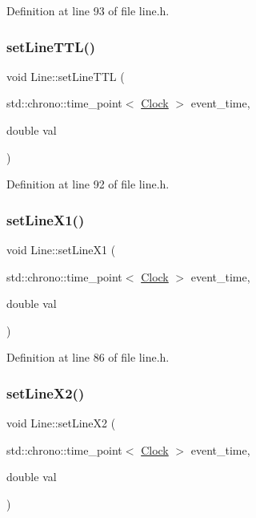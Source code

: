 Definition at line 93 of file line.\+h.

\mbox{\label{class_line_a602398c8c3131ec7236ccadbab8281d5}} 
\subsubsection{\texorpdfstring{set\+Line\+T\+T\+L()}{setLineTTL()}}
{\footnotesize\ttfamily void Line\+::set\+Line\+T\+TL (\begin{DoxyParamCaption}\item[{std\+::chrono\+::time\+\_\+point$<$ \hyperlink{universe_8h_a0ef8d951d1ca5ab3cfaf7ab4c7a6fd80}{Clock} $>$}]{event\+\_\+time,  }\item[{double}]{val }\end{DoxyParamCaption})\hspace{0.3cm}{\ttfamily [inline]}}



Definition at line 92 of file line.\+h.

\mbox{\label{class_line_ab8df9f66bffc86994db3150a4eb8ed29}} 
\subsubsection{\texorpdfstring{set\+Line\+X1()}{setLineX1()}}
{\footnotesize\ttfamily void Line\+::set\+Line\+X1 (\begin{DoxyParamCaption}\item[{std\+::chrono\+::time\+\_\+point$<$ \hyperlink{universe_8h_a0ef8d951d1ca5ab3cfaf7ab4c7a6fd80}{Clock} $>$}]{event\+\_\+time,  }\item[{double}]{val }\end{DoxyParamCaption})\hspace{0.3cm}{\ttfamily [inline]}}



Definition at line 86 of file line.\+h.

\mbox{\label{class_line_ade959bc4d4f69bb421ed4f69c0d77fb7}} 
\subsubsection{\texorpdfstring{set\+Line\+X2()}{setLineX2()}}
{\footnotesize\ttfamily void Line\+::set\+Line\+X2 (\begin{DoxyParamCaption}\item[{std\+::chrono\+::time\+\_\+point$<$ \hyperlink{universe_8h_a0ef8d951d1ca5ab3cfaf7ab4c7a6fd80}{Clock} $>$}]{event\+\_\+time,  }\item[{double}]{val }\end{DoxyParamCaption})\hspace{0.3cm}{\ttfamily [inline]}}



